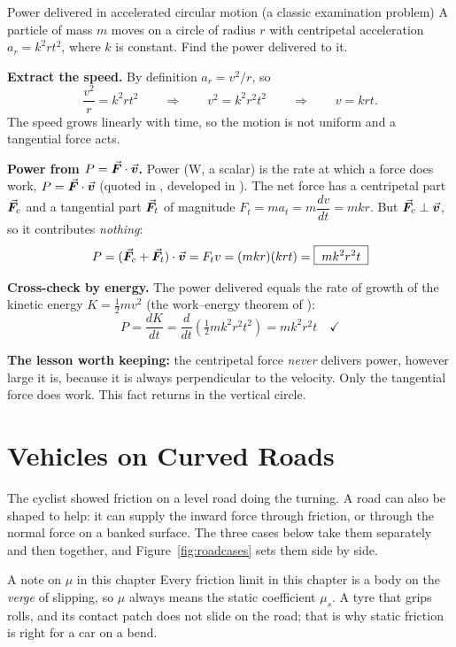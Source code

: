 \begin{exbox}{Power delivered in accelerated circular motion \textnormal{(a classic examination problem)}}
A particle of mass $m$ moves on a circle of radius $r$ with centripetal acceleration
$a_r=k^{2}rt^{2}$, where $k$ is constant. Find the power delivered to it.

 \textbf{Extract the speed.} By definition $a_r=v^{2}/r$, so
\[
\frac{v^{2}}{r}=k^{2}rt^{2}
\qquad\Longrightarrow\qquad
v^{2}=k^{2}r^{2}t^{2}
\qquad\Longrightarrow\qquad
v=krt.
\]
The speed grows linearly with time, so the motion is not uniform and a tangential force acts.

 \textbf{Power from $P=\vec{\bm{F}}\cdot\vec{\bm{v}}$.} Power (\si{W}, a scalar) is the rate at which a force does
work, $P=\vec{\bm{F}}\cdot\vec{\bm{v}}$ (quoted in , developed in ). The net force has a
centripetal part $\vec{\bm{F}}_c$ and a tangential part $\vec{\bm{F}}_t$ of magnitude $F_t=ma_t=m\dfrac{dv}{dt}=mkr$. But
$\vec{\bm{F}}_c\perp\vec{\bm{v}}$, so it contributes \emph{nothing}:
\[
P=(\vec{\bm{F}}_c+\vec{\bm{F}}_t)\cdot\vec{\bm{v}}=F_tv=(mkr)(krt)=\boxed{\;mk^{2}r^{2}t\;}
\]

 \textbf{Cross-check by energy.} The power delivered equals the rate of growth of the kinetic
energy $K=\tfrac{1}{2}mv^{2}$ (the work--energy theorem of ):
\[
P=\frac{dK}{dt}=\frac{d}{dt}\left(\tfrac{1}{2}mk^{2}r^{2}t^{2}\right)=mk^{2}r^{2}t \quad\checkmark
\]

\smallskip
\textbf{The lesson worth keeping:} the centripetal force \emph{never} delivers power, however large it
is, because it is always perpendicular to the velocity. Only the tangential force does work. This fact
returns in the vertical circle.
\end{exbox}

\section{Vehicles on Curved Roads}\label{sec:roads}
The cyclist showed friction on a level road doing the turning. A road can also be shaped to help: it
can supply the inward force through friction, or through the normal force on a banked surface. The three cases below take them separately and then together, and Figure~\ref{fig:roadcases} sets them side by side.

\begin{remarkbox}{A note on $\mu$ in this chapter}
Every friction limit in this chapter is a body on the \emph{verge} of slipping, so $\mu$ always means the
static coefficient $\mu_s$. A tyre that grips rolls, and its contact patch does not slide on the road;
that is why static friction is right for a car on a bend.
\end{remarkbox}

